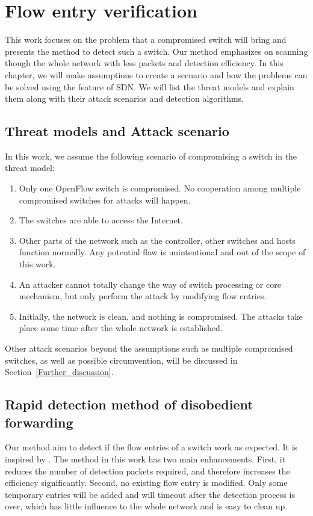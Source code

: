 \chapter{Flow entry verification}
This work focuses on the problem that a compromised switch will bring and presents the method to detect such a switch. Our method emphasizes on scanning though the whole network with less packets and detection efficiency. In this chapter, we will make assumptions to create a scenario and how the problems can be solved using the feature of SDN. We will list the threat models and explain them along with their attack scenarios and detection algorithms.

\section{Threat models and Attack scenario}
In this work, we assume the following scenario of compromising a switch in the threat model:
\begin{enumerate}
\item
Only one OpenFlow switch is compromised. No cooperation among multiple compromised switches for attacks will happen. 
\item
The switches are able to access the Internet. 
\item
Other parts of the network such as the controller, other switches and hosts function normally. Any potential flaw is unintentional and out of the scope of this work.
\item
An attacker cannot totally change the way of switch processing or core mechanism, but only perform the attack by modifying flow entries.
\item
Initially, the network is clean, and nothing is compromised. The attacks take place some time after the whole network is established.
\end{enumerate}

Other attack scenarios beyond the assumptions such as multiple compromised switches, as well as possible circumvention, will be discussed in Section~\ref{Further_discussion}.

\section{Rapid detection method of disobedient forwarding}
Our method aim to detect if the flow entries of a switch work as expected. It is inspired by \cite{CKGL15}. The method in this work has two main enhancements. First, it reduces the number of detection packets required, and therefore increases the efficiency significantly. Second, no existing flow entry is modified. Only some temporary entries will be added and will timeout after the detection process is over, which has little influence to the whole network and is easy to clean up. 

